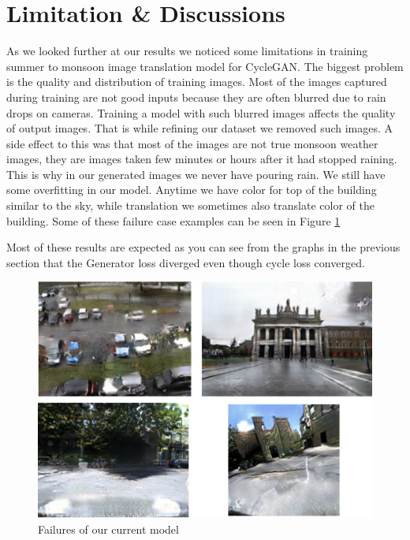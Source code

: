 \documentclass{article}
\begin{document}
\section{Limitation \& Discussions}
\label{limitationsanddiscussions}

As we looked further at our results we noticed some limitations in training summer to monsoon image translation model for CycleGAN. The biggest problem is the quality and distribution of training images. Most of the images captured during training are not good inputs because they are often blurred due to rain drops on cameras. Training a model with such blurred images affects the quality of output images. That is while refining our dataset we removed such images. A side effect to this was that most of the images are not true monsoon weather images, they are images taken few minutes or hours after it had stopped raining. This is why in our generated images we never have pouring rain. We still have some overfitting in our model. Anytime we have color for top of the building similar to the sky, while translation we sometimes also translate color of the building. Some of these failure case examples can be seen in Figure \ref{fig:failures}

Most of these results are expected as you can see from the graphs in the previous section that the Generator loss diverged even though cycle loss converged. 

\begin{figure}[h!]
	\centering
	\includegraphics[scale=0.45]{images/failures}
	\caption{Failures of our current model}
	\label{fig:failures}
\end{figure}
\end{document}
